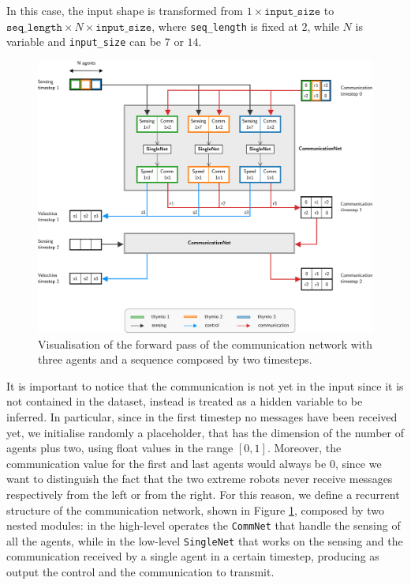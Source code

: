 In this case, the input shape is transformed from $1 \times \mathtt{input\_size}$ 
to $\mathtt{seq\_length} \times N \times \mathtt{input\_size}$, where 
\texttt{seq\_length} is fixed at $2$, while $N$ is variable and \texttt{input\_size} 
can be $7$ or $14$.

\begin{figure}[htb]
	\centering
	\includegraphics[width=\textwidth]{contents/images/commnet}
	\caption[Communication network.]{Visualisation of the forward pass of the 
	communication network with three agents and a sequence composed by two 
	timesteps.}
	\label{fig:commnet1}
\end{figure}

It is important to notice that the communication is not yet in the input since it is 
not contained in the dataset, instead is treated as a hidden variable to be inferred. 
In particular, since in the first timestep no messages have been received yet, we 
initialise randomly a placeholder, that has the dimension of the number of agents 
plus two, using float values in the range $[0, 1]$. 
Moreover, the communication value for the first and last agents would always be 
$0$, since we want to distinguish the fact that the two extreme robots never 
receive messages respectively from the left or from the right.
For this reason, we define a recurrent structure of the communication network, 
shown in Figure \ref{fig:commnet1}, composed by two nested modules: in the 
high-level operates the \texttt{CommNet} that handle the sensing of all the 
agents, while in the low-level \texttt{SingleNet} that works on the sensing and the 
communication received by a single agent in a certain timestep, producing as 
output the control and the communication to transmit. 

